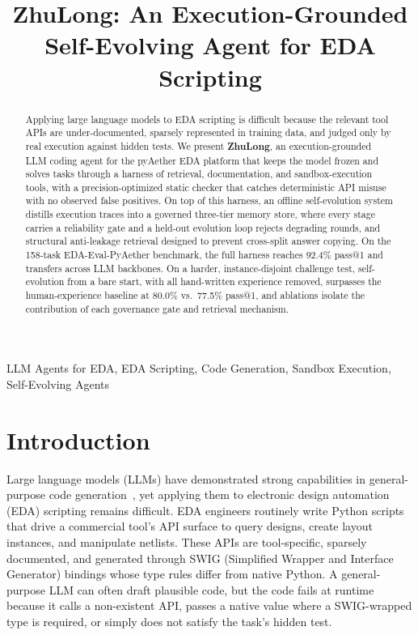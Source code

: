 \documentclass[conference]{IEEEtran}
\begin{document}
\title{ZhuLong: An Execution-Grounded Self-Evolving Agent for EDA Scripting}

\author{}

\maketitle

\begin{abstract}
Applying large language models to EDA scripting is difficult because the
relevant tool APIs are under-documented, sparsely represented in training
data, and judged only by real execution against hidden tests. We present
\textbf{ZhuLong}, an execution-grounded LLM coding agent for the pyAether
EDA platform that keeps the model frozen and solves tasks through a harness of
retrieval, documentation, and sandbox-execution tools, with a
precision-optimized static checker that catches deterministic API misuse
with no observed false positives. On top of this harness, an offline self-evolution
system distills execution traces into a governed three-tier memory store,
where every stage carries a reliability gate and a held-out evolution loop
rejects degrading rounds, and structural anti-leakage retrieval designed to prevent
cross-split answer copying. On the 158-task EDA-Eval-PyAether benchmark, the
full harness reaches 92.4\% pass@1 and transfers across LLM backbones. On a
harder, instance-disjoint challenge test, self-evolution from a bare start,
with all hand-written experience removed, surpasses the human-experience
baseline at 80.0\% vs.\ 77.5\% pass@1, and ablations isolate the contribution of each
governance gate and retrieval mechanism.
\end{abstract}

\begin{IEEEkeywords}
LLM Agents for EDA, EDA Scripting, Code Generation, Sandbox Execution, Self-Evolving Agents
\end{IEEEkeywords}

\section{Introduction}
\label{sec:introduction}

Large language models (LLMs) have demonstrated strong capabilities in
general-purpose code generation~\cite{wu2025openroad}, yet applying them to
electronic design automation (EDA) scripting remains difficult. EDA engineers
routinely write Python scripts that drive a commercial tool's API surface to
query designs, create layout instances, and manipulate netlists. These APIs
are tool-specific, sparsely documented, and generated through SWIG (Simplified Wrapper and Interface Generator) bindings
whose type rules differ from native Python. A general-purpose LLM can often
draft plausible code, but the code fails at runtime because it calls a
non-existent API, passes a native value where a SWIG-wrapped type is required,
or simply does not satisfy the task's hidden test.
\end{document}
